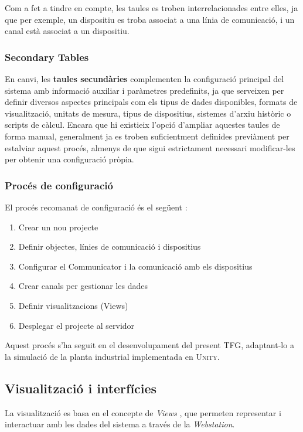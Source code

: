 \documentclass[a4paper,11pt,DIV=13,headings=normal,abstract=true,twoside=semi]{article}
\newcommand{\acro}[1]{\textsc{#1}}
\begin{document}
Com a fet a tindre en compte, les taules es troben interrelacionades entre elles, ja que per exemple, un dispositiu es troba associat a una línia de comunicació, i un canal està associat a un dispositiu.

\subsubsection*{Secondary Tables}


En canvi, les \textbf{taules secundàries} complementen la configuració principal del sistema amb informació auxiliar i paràmetres predefinits, ja que serveixen per definir diversos aspectes principals com els tipus de dades disponibles, formats de visualització, unitats de mesura, tipus de dispositius, sistemes d'arxiu històric o scripts de càlcul. Encara que hi existieix l'opció d'ampliar aquestes taules de forma manual, generalment ja es troben suficientment definides previàment per estalviar aquest procés, almenys de que sigui estrictament necessari modificar-les per obtenir una configuració pròpia. 

\subsubsection{Procés de configuració}

 El procés recomanat de configuració és el següent \cite{rapidscada_config_basics}:

\begin{enumerate}
    \item Crear un nou projecte
    \item Definir objectes, línies de comunicació i dispositius
    \item Configurar el Communicator i la comunicació amb els dispositius
    \item Crear canals per gestionar les dades
    \item Definir visualitzacions (Views)
    \item Desplegar el projecte al servidor
\end{enumerate}

Aquest procés s'ha seguit en el desenvolupament del present \acro{TFG}, adaptant-lo a la simulació de la planta industrial implementada en \acro{Unity}.

\subsection{Visualització i interfícies}
La visualització es basa en el concepte de \emph{Views} \cite{rapidscada_views}, que permeten representar i interactuar amb les dades del sistema a través de la \emph{Webstation}.
\end{document}
